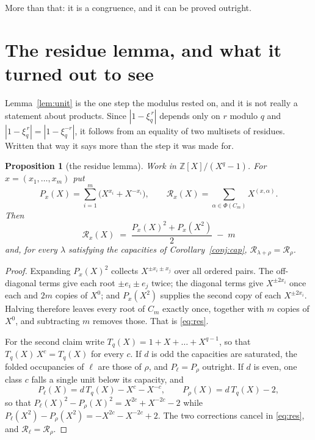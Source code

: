 \documentclass[11pt,a4paper]{article}
\newtheorem{proposition}[theorem]{Proposition}
\theoremstyle{definition}
\newcommand{\ZZ}{\mathbb{Z}}
\begin{document}
\smallskip
\noindent More than that: it is a congruence, and it can be proved outright.

\section{The residue lemma, and what it turned out to see}\label{sec:res}

\noindent Lemma~\ref{lem:unit} is the one step the modulus rested on, and it is not really a
statement about products. Since $|1-\xi_q^{\,r}|$ depends only on $r$ modulo $q$ and
$|1-\xi_q^{\,r}|=|1-\xi_q^{-r}|$, it follows from an equality of two multisets of residues.
Written that way it says more than the step it was made for.

\begin{proposition}[the residue lemma]\label{prop:res}
Work in $\ZZ[X]/(X^q-1)$. For $x=(x_1,\dots,x_m)$ put
\[
P_x(X)=\sum_{i=1}^{m}\bigl(X^{x_i}+X^{-x_i}\bigr),
\qquad
\mathscr{R}_x(X)=\sum_{\alpha\in\Phi(C_m)}X^{(x,\alpha)} .
\]
Then
\begin{equation}\label{eq:res}
\boxed{\;\mathscr{R}_x(X)\;=\;\frac{P_x(X)^2+P_x(X^2)}{2}\;-\;m\;}
\end{equation}
and, for every $\lambda$ satisfying the capacities of Corollary~\ref{conj:cap},
$\mathscr{R}_{\lambda+\rho}=\mathscr{R}_\rho$.
\end{proposition}

\begin{proof}
Expanding $P_x(X)^2$ collects $X^{\pm x_i\pm x_j}$ over all ordered pairs. The off-diagonal terms
give each root $\pm e_i\pm e_j$ twice; the diagonal terms give $X^{\pm2x_i}$ once each and $2m$
copies of $X^0$; and $P_x(X^2)$ supplies the second copy of each $X^{\pm2x_i}$. Halving therefore
leaves every root of $C_m$ exactly once, together with $m$ copies of $X^0$, and subtracting $m$
removes those. That is \eqref{eq:res}.

For the second claim write $T_q(X)=1+X+\dots+X^{q-1}$, so that $T_q(X)\,X^{c}=T_q(X)$ for every $c$.
If $d$ is odd the capacities are saturated, the folded occupancies of $\ell$ are those of $\rho$, and
$P_\ell=P_\rho$ outright. If $d$ is even, one class $c$ falls a single unit below its capacity, and
\[
P_\ell(X)=d\,T_q(X)-X^{c}-X^{-c},\qquad P_\rho(X)=d\,T_q(X)-2 ,
\]
so that $P_\ell(X)^2-P_\rho(X)^2=X^{2c}+X^{-2c}-2$ while
$P_\ell(X^2)-P_\rho(X^2)=-X^{2c}-X^{-2c}+2$. The two corrections cancel in \eqref{eq:res}, and
$\mathscr{R}_\ell=\mathscr{R}_\rho$.
\end{proof}
\end{document}
